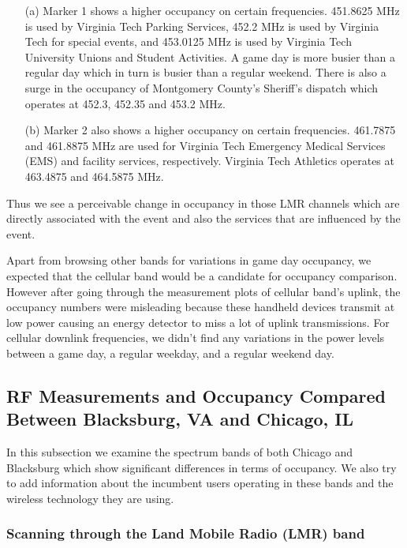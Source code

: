 \documentclass[12pt,sts]{report}
\begin{document}
		\begin{enumerate}
			\item[(a)] Marker 1 shows a higher occupancy on certain frequencies. 451.8625 MHz is used by Virginia Tech Parking Services, 452.2 MHz is used by Virginia Tech for special events, and 453.0125 MHz is used by Virginia Tech University Unions and Student Activities. A game day is more busier than a regular day which in turn is busier than a regular weekend. There is also a surge in the occupancy of Montgomery County's Sheriff's dispatch which operates at 452.3, 452.35 and 453.2 MHz.
			\item[(b)] Marker 2 also shows a higher occupancy on certain frequencies. 461.7875 and 461.8875 MHz are used for Virginia Tech Emergency Medical Services (EMS) and facility services, respectively. Virginia Tech Athletics operates at 463.4875 and 464.5875 MHz.
		\end{enumerate}
		
		Thus we see a perceivable change in occupancy in those LMR channels which are directly associated with the event and also the services that are influenced by the event.
		
		Apart from browsing other bands for variations in game day occupancy, we expected that the cellular band would be a candidate for occupancy comparison. However after going through the measurement plots of cellular band's uplink, the occupancy numbers were misleading because these handheld devices transmit at low power causing an energy detector to miss a lot of uplink transmissions. For cellular downlink frequencies, we didn't find any variations in the power levels between a game day, a regular weekday, and a regular weekend day. 
 	
	\subsection{RF Measurements and Occupancy Compared Between Blacksburg, VA and Chicago, IL}
	
	In this subsection we examine the spectrum bands of both Chicago and Blacksburg which show significant differences in terms of occupancy. We also try to add information about the incumbent users operating in these bands and the wireless technology they are using.
	
		\subsubsection{Scanning through the Land Mobile Radio (LMR) band}
		
\end{document}
